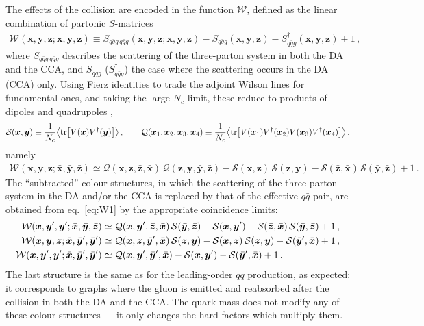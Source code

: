 \documentclass[11pt,a4paper]{article}
\newcommand{\calW}{\mathcal{W}}
\newcommand{\calQ}{\mathcal{Q}}
\newcommand{\calS}{\mathcal{S}}
\newcommand{\vx}{\bm{x}}
\newcommand{\vy}{\bm{y}}
\newcommand{\vz}{\bm{z}}
\newcommand{\vxb}{\bar{\bm{x}}}
\newcommand{\vyb}{\bar{\bm{y}}}
\newcommand{\vzb}{\bar{\bm{z}}}
\numberwithin{equation}{section}
\begin{document}
The effects of the collision are encoded in the function $\calW$, defined as the linear
combination of partonic $S$-matrices
\begin{align}
\label{eq:Wdef}
\calW(\vx,\vy,\vz;\vxb,\vyb,\vzb) \equiv
S_{q\bar{q}g\,q\bar{q}g}(\vx,\vy,\vz;\vxb,\vyb,\vzb)
-S_{q\bar{q}g}(\vx,\vy,\vz) - S^{\dagger}_{q\bar{q}g}(\vxb,\vyb,\vzb) + 1\,,
\end{align}
where $S_{q\bar qg\,q\bar qg}$ describes the scattering of the three-parton system in both the
DA and the CCA, and $S_{q\bar qg}$ ($S^\dagger_{q\bar qg}$) the case where the scattering
occurs in the DA (CCA) only. Using Fierz identities to trade the adjoint Wilson lines for
fundamental ones, and taking the large-$N_c$ limit, these reduce to products of dipoles and
quadrupoles \cite{Iancu:2022gpw},
\begin{equation}
\calS(\vx,\vy)\equiv\frac{1}{N_{c}}\big\langle{\rm tr}\big[V(\vx)V^{\dagger}(\vy)\big]
\big\rangle\,,\qquad
\calQ(\vx_{1},\vx_{2},\vx_{3},\vx_{4})\equiv\frac{1}{N_{c}}\big\langle{\rm tr}
\big[V(\vx_{1})V^{\dagger}(\vx_{2})V(\vx_{3})V^{\dagger}(\vx_{4})\big]\big\rangle\,,
\end{equation}
namely
\begin{align}
\label{eq:W1}
\calW(\vx,\vy,\vz;\vxb,\vyb,\vzb) \simeq \calQ(\vx,\vz,\vzb,\vxb)\, \calQ(\vz,\vy,\vyb,\vzb)
- \calS(\vx,\vz)\,\calS(\vz,\vy) - \calS(\vzb,\vxb)\,\calS(\vyb,\vzb) +1\,.
\end{align}
The ``subtracted'' colour structures, in which the scattering of the three-parton system in
the DA and/or the CCA is replaced by that of the effective $q\bar q$ pair, are obtained from
eq.~\eqref{eq:W1} by the appropriate coincidence limits:
\begin{align}
\label{eq:W234}
\calW(\vx,\vy',\vy';\vxb,\vyb,\vzb) &\simeq \calQ(\vx,\vy',\vzb,\vxb)\,\calS(\vyb,\vzb)
- \calS(\vx,\vy') - \calS(\vzb,\vxb)\,\calS(\vyb,\vzb) +1\,,\notag\\
\calW(\vx,\vy,\vz;\vxb,\vyb',\vyb') &\simeq \calQ(\vx,\vz,\vyb',\vxb)\,\calS(\vz,\vy)
- \calS(\vx,\vz)\,\calS(\vz,\vy) - \calS(\vyb',\vxb) +1\,,\notag\\
\calW(\vx,\vy',\vy';\vxb,\vyb',\vyb') &\simeq \calQ(\vx,\vy',\vyb',\vxb)
-\calS(\vx,\vy') - \calS(\vyb',\vxb) +1\,.
\end{align}
The last structure is the same as for the leading-order $q\bar q$ production, as expected: it
corresponds to graphs where the gluon is emitted and reabsorbed after the collision in both
the DA and the CCA. The quark mass does not modify any of these colour structures --- it only
changes the hard factors which multiply them.
\end{document}
